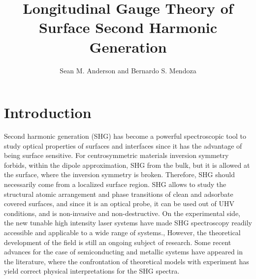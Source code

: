 \documentclass{article}
\begin{document}
\title{Longitudinal Gauge Theory of Surface Second Harmonic Generation}
\author{Sean M. Anderson and Bernardo S. Mendoza}



\maketitle
\tableofcontents

\section{Introduction}\label{intro}

Second harmonic generation (SHG) has become a powerful spectroscopic  tool to study optical properties of surfaces and interfaces since it has the advantage of being surface sensitive. For centrosymmetric materials inversion symmetry forbids, within the dipole approximation, SHG from the bulk, but it is allowed at the surface, where the inversion symmetry is broken. Therefore, SHG should necessarily come from a localized surface region. SHG allows to study the structural atomic arrangement and phase transitions of clean and adsorbate covered surfaces, and since it is an optical probe, it can be used out of UHV conditions, and is non-invasive and non-destructive. On the experimental side, the new tunable high intensity laser systems have made SHG spectroscopy readily accessible and applicable to a wide range of systems.\cite{downer_optical_2001},\cite{lupke_characterization_1999} However, the theoretical development of the field is still an ongoing subject of research. Some recent advances for the case of semiconducting and metallic systems have appeared in the literature, where the confrontation of theoretical
models with experiment has yield correct physical interpretations for the SHG spectra.\cite{downer_optical_2001,mendoza_ab_2001,lim_optical_2000,gavrilenko_optical_2000,mendoza_visible-infrared_1999,mendoza_microscopic_1998,mendoza_local-field_1996,mendoza_polarizable-bond_1997,guyot-sionnest_electronic_1990}
\end{document}
